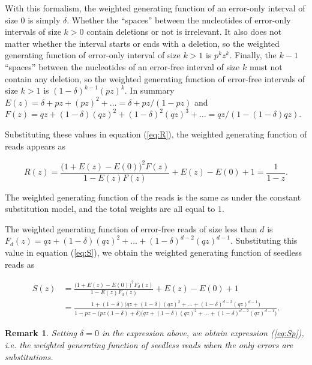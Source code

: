 \documentclass{article}
\newtheorem{remark}{Remark}
\begin{document}
With this formalism, the weighted generating function of an error-only
interval of size $0$ is simply $\delta$. Whether the ``spaces'' between
the nucleotides of error-only intervals of size $k > 0$ contain deletions
or not is irrelevant. It also does not matter whether the interval starts
or ends with a deletion, so the weighted generating function of error-only
interval of size $k>1$ is $p^kz^k$. Finally, the $k-1$ ``spaces'' between
the nucleotides of an error-free interval of size $k$ must not contain any
deletion, so the weighted generating function of error-free intervals of
size $k>1$ is $(1-\delta)^{k-1}(pz)^k$. In summary $E(z) = \delta + pz +
(pz)^2 + \ldots = \delta + pz / (1-pz)$ and $F(z) = qz + (1-\delta)(qz)^2
+ (1-\delta)^2(qz)^3 + \ldots = qz / (1-(1-\delta)qz)$.

Substituting these values in equation (\ref{eq:R}), the weighted
generating function of reads appears as

\begin{equation*}
R(z) = \frac{\big(1+E(z)-E(0)\big)^2F(z)}{1-E(z)F(z)} + E(z)-E(0)+1 =
\frac{1}{1-z}.
\end{equation*}

The weighted generating function of the reads is the same as under the
constant substitution model, and the total weights are all equal to $1$.

The weighted generating function of error-free reads of size less than $d$
is $F_d(z) = qz + (1-\delta)(qz)^2 + \ldots + (1-\delta)^{d-2}(qz)^{d-1}$.
Substituting this value in equation (\ref{eq:S}), we obtain the
weighted generating function of seedless reads as

\begin{equation*}
\begin{split}
S(z) &= \frac{\big(1+E(z)-E(0)\big)^2F_d(z)}{1-E(z)F_d(z)} +
  E(z)-E(0)+1 \\
&= \frac{1+(1-\delta)\big(qz+(1-\delta)(qz)^2 + \ldots +
  (1-\delta)^{d-2}(qz)^{d-1}\big)}
  {1-pz - \big(pz(1-\delta) + \delta\big)\big(qz+(1-\delta)(qz)^2 +
  \ldots + (1-\delta)^{d-2}(qz)^{d-1}\big)}.
\end{split}
\end{equation*}

\begin{remark}
Setting $\delta = 0$ in the expression above, we obtain expression
(\ref{eq:Sp}), \textit{i.e.} the weighted generating function of seedless
reads when the only errors are substitutions.
\end{remark}
\end{document}
